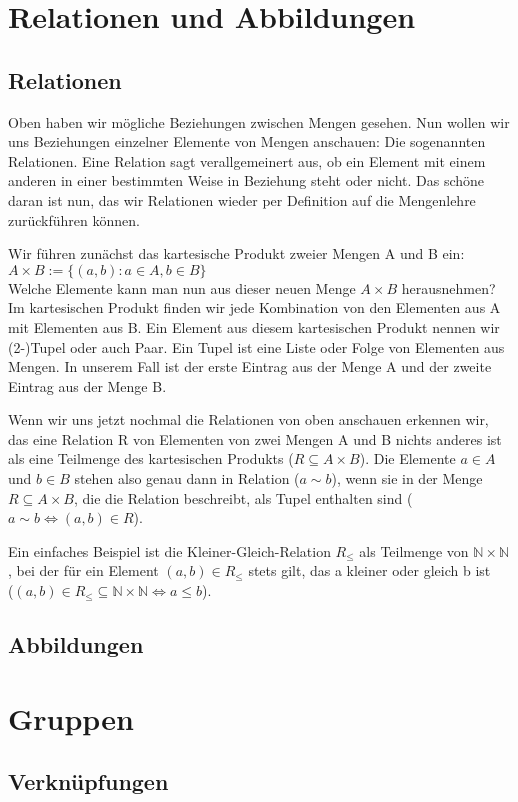 \documentclass[parskip=full]{scrartcl}
\begin{document}
\section{Relationen und Abbildungen}
    \subsection{Relationen}
        Oben haben wir mögliche Beziehungen zwischen Mengen gesehen.
        Nun wollen wir uns Beziehungen einzelner Elemente von Mengen anschauen: Die sogenannten Relationen.
        Eine Relation sagt verallgemeinert aus, ob ein Element mit einem anderen in einer bestimmten Weise in Beziehung steht oder nicht.
        Das schöne daran ist nun, das wir Relationen wieder per Definition auf die Mengenlehre zurückführen können.

        Wir führen zunächst das kartesische Produkt zweier Mengen A und B ein:
        \\\quad\(A \times B := \{(a, b) : a \in A, b \in B\}\)
        \\Welche Elemente kann man nun aus dieser neuen Menge \(A \times B\) herausnehmen?
        Im kartesischen Produkt finden wir jede Kombination von den Elementen aus A mit Elementen aus B.
        Ein Element aus diesem kartesischen Produkt nennen wir (2-)Tupel oder auch Paar. 
        Ein Tupel ist eine Liste oder Folge von Elementen aus Mengen. 
        In unserem Fall ist der erste Eintrag aus der Menge A und der zweite Eintrag aus der Menge B.

        Wenn wir uns jetzt nochmal die Relationen von oben anschauen erkennen wir, 
        das eine Relation R von Elementen von zwei Mengen A und B nichts anderes ist als eine Teilmenge des kartesischen Produkts
        (\(R \subseteq A \times B\)).
        Die Elemente \(a \in A\) und \(b \in B\) stehen also genau dann in Relation (\(a \sim b\)), 
        wenn sie in der Menge \(R \subseteq A \times B\), die die Relation beschreibt, als Tupel enthalten sind
        (\(a \sim b \iff (a, b) \in R\)).

        Ein einfaches Beispiel ist die Kleiner-Gleich-Relation \(R_\leq\) als Teilmenge von \(\mathbb{N} \times \mathbb{N}\), 
        bei der für ein Element \((a, b) \in R_\leq\) stets gilt, das a kleiner oder gleich b ist 
        \\(\((a, b) \in R_\leq \subseteq \mathbb{N} \times \mathbb{N} \iff a \leq b\)). 

    \subsection{Abbildungen}

\section{Gruppen}
    \subsection{Verknüpfungen}
\end{document}
